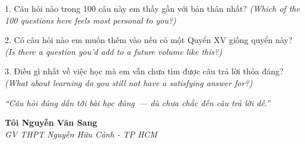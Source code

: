\begin{tuhocnhanh}
1. Câu hỏi nào trong 100 câu này em thấy gần với bản thân nhất? \textit{(Which of the 100 questions here feels most personal to you?)}

2. Có câu hỏi nào em muốn thêm vào nếu có một Quyển XV giống quyển này? \textit{(Is there a question you'd add to a future volume like this?)}

3. Điều gì nhất về việc học mà em vẫn chưa tìm được câu trả lời thỏa đáng? \textit{(What about learning do you still not have a satisfying answer for?)}
\end{tuhocnhanh}

\begin{center}
\textit{\color{papergold}``Câu hỏi đúng dẫn tới bài học đúng~--- dù chưa chắc đến câu trả lời dễ.''}
\end{center}

\begin{flushright}
\textbf{Tôi Nguyễn Văn Sang}\\
\textit{GV THPT Nguyễn Hữu Cảnh - TP HCM}
\end{flushright}

\ngancach
